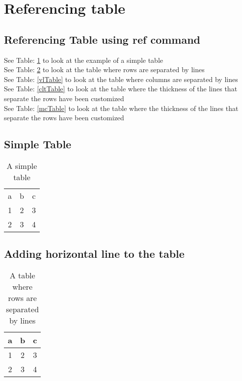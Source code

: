 \section{Referencing table}


\subsection{Referencing Table using ref command}
See Table: \ref{simpTable} to look at the example of a simple table \\
See Table: \ref{hlTable} to look at the table where rows are separated by lines \\
See Table: \ref{vlTable} to look at the table where columns are separated by lines\\
See Table: \ref{cltTable} to look at the table where the  thickness of the
lines that separate the rows have been customized\\
See Table: \ref{mcTable} to look at the table where the  thickness of the
lines that separate the rows have been customized\\


\newpage
\subsection{Simple Table}

\begin{table}[!htbp]
\begin{tabular}{ccc}
a & b & c \\
1 & 2 & 3 \\
2 & 3 & 4
\end{tabular}
\caption[Simple Table]{A simple table}
\label{simpTable}
\end{table}


\subsection{Adding horizontal line to the table}

\begin{table}[!htbp]
\begin{tabular}{ccc}
\hline
a & b & c \\
\hline
1 & 2 & 3 \\
2 & 3 & 4\\
\hline
\end{tabular}
\caption[Row separation]{A table where rows are separated by lines}
\label{hlTable}
\end{table}



